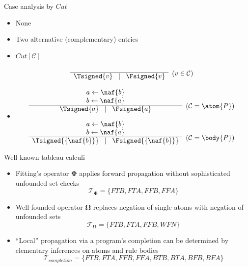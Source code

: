 \begin{frame}{Case analysis by $\textit{Cut}$}
\begin{itemize}
\item {} None
\item {} Two alternative (complementary) entries
\item {} \textnormal{$\textit{Cut}[\mathcal{C}]$}~\\[-5mm]
\[
\begin{array}{cl}
&
\raisebox{-8pt}[0pt][0pt]{($v \in {\mathcal{C}}$)}
\\\cline{1-1}
\Tsigned{v} \;\; \mid \;\; \Fsigned{v}
\end{array}
\]
\item<2-> 
\[
\begin{array}{cl}
a \leftarrow \naf{b} \\
b \leftarrow \naf{a} &
\raisebox{-8pt}[0pt][0pt]{(${\mathcal{C}} = \atom{P}$)}
\\\cline{1-1}
\Tsigned{a} \;\; \mid \;\; \Fsigned{a}
\\[10pt]
a \leftarrow \naf{b} \\
b \leftarrow \naf{a} &
\raisebox{-8pt}[0pt][0pt]{(${\mathcal{C}} = \body{P}$)}
\\\cline{1-1}
\Tsigned{\{\naf{b}\}} \;\; \mid \;\; \Fsigned{\{\naf{b}\}}
\end{array}
\]
\end{itemize}
\end{frame}
\begin{frame}{Well-known tableau calculi}
  \begin{itemize}
  \item <1-> Fitting's operator $\mathbf{\Phi}$ applies forward propagation without sophisticated
    unfounded set checks
    \[
    {\mathcal{T}}_{\mathbf{\Phi}} = \{\textit{FTB},\textit{FTA},\textit{FFB},\textit{FFA}\}
    \]
  \item <2-> Well-founded operator $\mathbf{\Omega}$ replaces negation of single atoms with negation
    of unfounded sets
    \[
    {\mathcal{T}}_{\mathbf{\Omega}} = \{\textit{FTB},\textit{FTA},\textit{FFB},\textit{WFN}\}
    \]
  \item <3-> ``Local'' propagation via a program's completion can be determined by elementary
    inferences on atoms and rule bodies
    \[
    {\mathcal{T}}_{\textit{completion}} =
    \{\textit{FTB},\textit{FTA},\textit{FFB},\textit{FFA},\textit{BTB},\textit{BTA},\textit{BFB},\textit{BFA}\}
    \]
  \end{itemize}
\end{frame}
